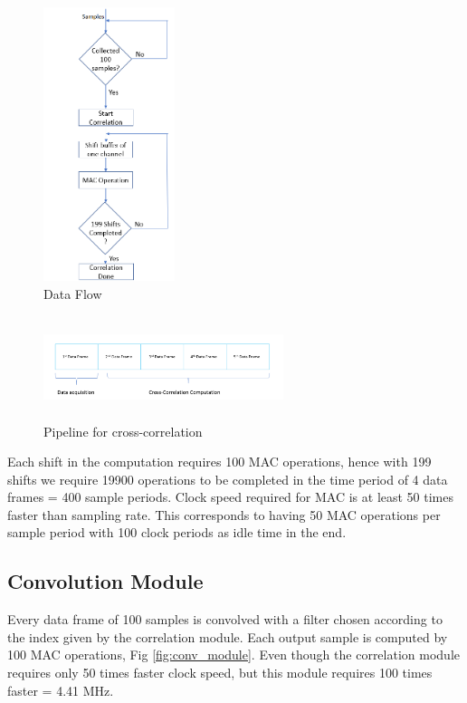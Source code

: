 \documentclass[conference]{IEEEtran}
\begin{document}
\begin{figure}
    \centering
    \includegraphics[height = 8cm]{xcorr_flow.png}
    \caption{Data Flow}
    \label{fig:xcorrflow}
\end{figure}

\begin{figure}
    \centering
    \includegraphics[height = 3cm, width = 7cm]{modified_xcorr.png}
    \caption{Pipeline for cross-correlation}
    \label{fig:modxcorr}
\end{figure}

Each shift in the computation requires 100 MAC operations, hence with 199 shifts we require 19900 operations to be completed in the time period of 4 data frames = 400 sample periods. Clock speed required for MAC is at least 50 times faster than sampling rate. This corresponds to having 50 MAC operations per sample period with 100 clock periods as idle time in the end.

\subsection{Convolution Module}
Every data frame of 100 samples is convolved with a filter chosen according to the index given by the correlation module. Each output sample is computed by 100 MAC operations, Fig \ref{fig:conv_module}. Even though the correlation module requires only 50 times faster clock speed, but this module requires 100 times faster = 4.41 MHz. 
\end{document}

